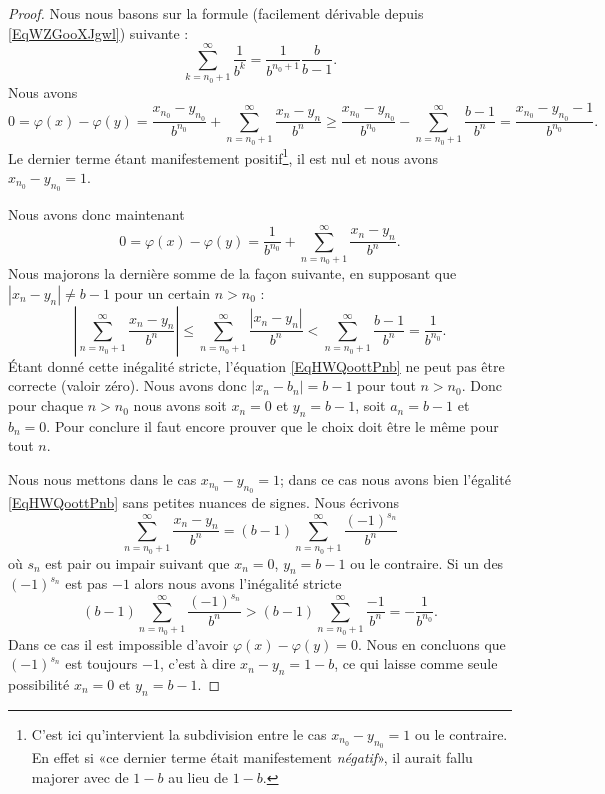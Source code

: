 \begin{proof}
    Nous nous basons sur la formule (facilement dérivable depuis \eqref{EqWZGooXJgwl}) suivante :
    \begin{equation}
        \sum_{k=n_0+1}^{\infty}\frac{1}{ b^k }=\frac{1}{ b^{n_0+1} }\frac{ b }{ b-1 }.
    \end{equation}
    Nous avons 
    \begin{equation}
        0=\varphi(x)-\varphi(y)=\frac{ x_{n_0}-y_{n_0} }{ b^{n_0} }+\sum_{n=n_0+1}^{\infty}\frac{ x_n-y_n }{ b^n }\geq \frac{ x_{n_0}-y_{n_0} }{ b^{n_0} }-\sum_{n=n_0+1}^{\infty}\frac{ b-1 }{ b^n }=\frac{ x_{n_0}-y_{n_0}-1 }{ b^{n_0} }.
    \end{equation}
    Le dernier terme étant manifestement positif\footnote{C'est ici qu'intervient la subdivision entre le cas \( x_{n_0}-y_{n_0}=1\) ou le contraire. En effet si «ce dernier terme était manifestement \emph{négatif}», il aurait fallu majorer avec de \( 1-b\) au lieu de \( 1-b\).}, il est nul et nous avons \( x_{n_0}-y_{n_0}=1\).

    Nous avons donc maintenant
    \begin{equation}    \label{EqHWQoottPnb}
        0=\varphi(x)-\varphi(y)=\frac{1}{ b^{n_0} }+\sum_{n=n_0+1}^{\infty}\frac{ x_n-y_n }{ b^n }.
    \end{equation}
    Nous majorons la dernière somme de la façon suivante, en supposant que \( | x_n-y_n |\neq b-1\) pour un certain \( n>n_0\) :
    \begin{equation}
        \left| \sum_{n=n_0+1}^{\infty}\frac{ x_n-y_n }{ b^n } \right| \leq\sum_{n=n_0+1}^{\infty}\frac{ | x_n-y_n | }{ b^n }<\sum_{n=n_0+1}^{\infty}\frac{ b-1 }{ b^n }=\frac{1}{ b^{n_0} }.
    \end{equation}
    Étant donné cette inégalité stricte, l'équation \eqref{EqHWQoottPnb} ne peut pas être correcte (valoir zéro). Nous avons donc \( | x_n-b_n |=b-1\) pour tout \( n>n_0\). Donc pour chaque \( n>n_0\) nous avons soit \( x_n=0\) et \( y_n=b-1\), soit \( a_n=b-1\) et \( b_n=0\). Pour conclure il faut encore prouver que le choix doit être le même pour tout \( n\).

    Nous nous mettons dans le cas \( x_{n_0}-y_{n_0}=1\); dans ce cas nous avons bien l'égalité \eqref{EqHWQoottPnb} sans petites nuances de signes. Nous écrivons
    \begin{equation}
        \sum_{n=n_0+1}^{\infty}\frac{ x_n-y_n }{ b^n }=(b-1)\sum_{n=n_0+1}^{\infty}\frac{ (-1)^{s_n} }{ b^n }
    \end{equation}
    où \( s_n\) est pair ou impair suivant que \( x_n=0\), \( y_n=b-1\) ou le contraire. Si un des \( (-1)^{s_n}\) est pas \( -1\) alors nous avons l'inégalité stricte
    \begin{equation}
        (b-1)\sum_{n=n_0+1}^{\infty}\frac{ (-1)^{s_n} }{ b^n }>(b-1)\sum_{n=n_0+1}^{\infty}\frac{-1}{ b^n }=-\frac{1}{ b^{n_0} }.
    \end{equation}
    Dans ce cas il est impossible d'avoir \( \varphi(x)-\varphi(y)=0\). Nous en concluons que \( (-1)^{s_n}\) est toujours \( -1\), c'est à dire \( x_n-y_n=1-b\), ce qui laisse comme seule possibilité \( x_n=0\) et \( y_n=b-1\).
\end{proof}

